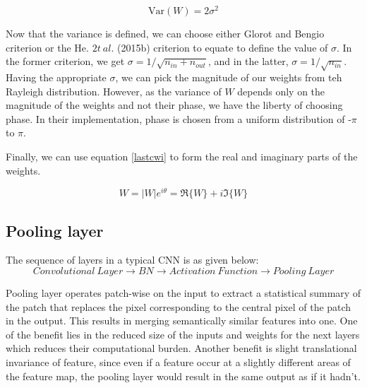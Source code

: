  
 \begin{equation}\label{ray2}
 \mathrm{Var}(W) = 2\sigma^2
 \end{equation}
 
 Now that the variance is defined,  we can choose either Glorot and Bengio criterion or the He. $2t \ al.$ (2015b) criterion to equate to define the value of $\sigma$. In the former criterion, we get $\sigma = 1/\sqrt{n_{in}+n_{out}}$, and in the latter, $\sigma = 1/\sqrt{n_{in}}$. Having the appropriate $\sigma$, we can pick the magnitude of our weights from teh Rayleigh distribution. However, as the variance of $W$ depends only on the magnitude of the weights and not their phase,  we have the liberty of choosing phase. In their implementation, phase is chosen from a uniform distribution of -$\pi$ to $\pi$.
 
 Finally, we can use equation \ref{lastcwi} to form the real and imaginary parts of the weights.
 
 \begin{equation}\label{lastcwi}
 W = |W|e^{i\theta} = \Re\{W\}+i\Im\{W\}
 \end{equation}
 
 
 
 
 
 \subsection{Pooling layer}
 The sequence of layers in a typical CNN is as given below: 
 \begin{equation}
 Convolutional \ Layer\longrightarrow BN \longrightarrow Activation \ Function \longrightarrow  Pooling \ Layer
 \end{equation}
 
 Pooling layer operates patch-wise on the input to extract a statistical summary of the patch that replaces the pixel corresponding to the central pixel of the patch in the output. This results in merging semantically similar features into one. One of the benefit lies in the reduced size of the inputs and weights for the next layers which reduces their computational burden. Another benefit is slight translational invariance of feature, since even if a feature occur at a slightly different areas of the feature map, the pooling layer would result in the same output as if it hadn't. 

